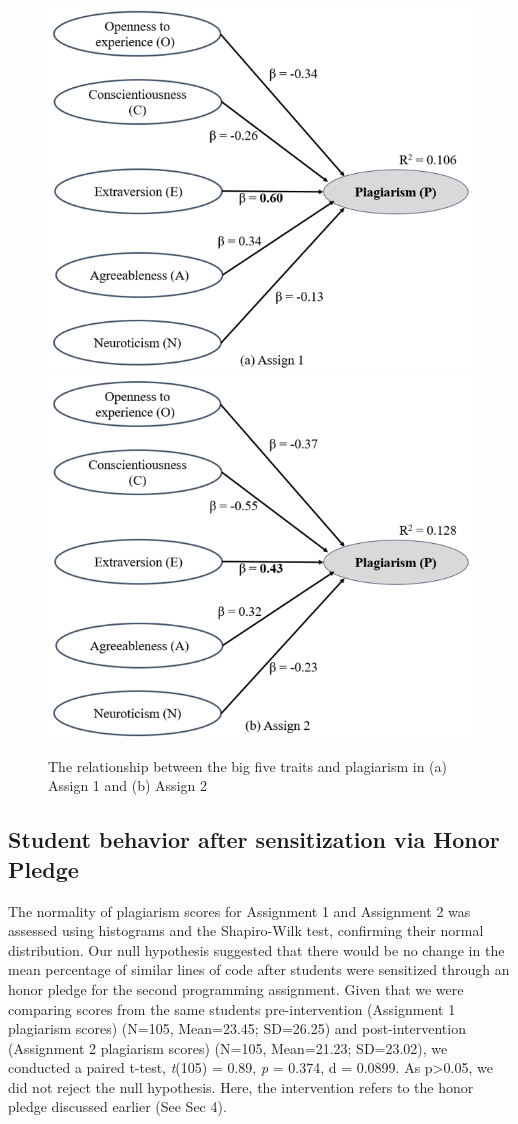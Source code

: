 \begin{figure}[H]
  \centering
  \includegraphics[width=0.75\columnwidth]{2a.png}
  \includegraphics[width=0.75\columnwidth]{2b.png}
  \caption{The relationship between the big five traits and plagiarism in (a) Assign 1 and (b) Assign 2}
  \label{fig:personalityAndPlagiarism}\vspace{-4pt}
\end{figure}

\subsection{Student behavior after sensitization via Honor Pledge }

The normality of plagiarism scores for Assignment 1 and Assignment 2 was assessed using histograms and the Shapiro-Wilk test, confirming their normal distribution. Our null hypothesis suggested that there would be no change in the mean percentage of similar lines of code after students were sensitized through an honor pledge for the second programming assignment. Given that we were comparing scores from the same students pre-intervention (Assignment 1 plagiarism scores) (N=105, Mean=23.45; SD=26.25) and post-intervention (Assignment 2 plagiarism scores) (N=105, Mean=21.23; SD=23.02), we conducted a paired t-test, \textit{t}(105) = 0.89, \emph{p} = 0.374, d = 0.0899. As p>0.05, we did not reject the null hypothesis. Here, the intervention refers to the honor pledge discussed earlier (See Sec 4).

